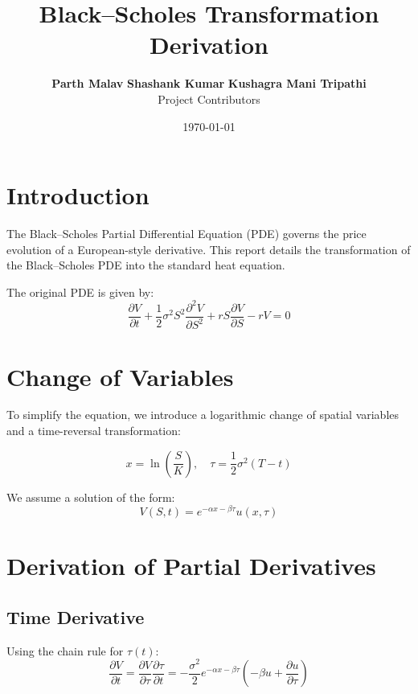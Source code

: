\documentclass[11pt,a4paper]{article}
\title{\vspace{-2cm} \textbf{Black--Scholes Transformation Derivation}}
\author{
    \textbf{Parth Malav} \quad 
    \textbf{Shashank Kumar} \quad 
    \textbf{Kushagra Mani Tripathi} \\
    \small Project Contributors
}
\date{\today}
\begin{document}
\maketitle

\section{Introduction}
The Black--Scholes Partial Differential Equation (PDE) governs the price evolution of a European-style derivative. This report details the transformation of the Black--Scholes PDE into the standard heat equation.

The original PDE is given by:
\begin{equation}
\frac{\partial V}{\partial t}
+ \frac{1}{2}\sigma^2 S^2 \frac{\partial^2 V}{\partial S^2}
+ rS \frac{\partial V}{\partial S}
- rV = 0
\end{equation}

\section{Change of Variables}
To simplify the equation, we introduce a logarithmic change of spatial variables and a time-reversal transformation:

\begin{mdframed}[linecolor=gray!20, backgroundcolor=gray!5]
\begin{equation}
x = \ln\left(\frac{S}{K}\right), \quad \tau = \frac{1}{2}\sigma^2 (T - t)
\end{equation}
\end{mdframed}

We assume a solution of the form:
\begin{equation}
V(S,t) = e^{-\alpha x - \beta \tau} u(x,\tau)
\end{equation}

\section{Derivation of Partial Derivatives}

\subsection{Time Derivative}
Using the chain rule for $\tau(t)$:
\begin{equation}
\frac{\partial V}{\partial t} = \frac{\partial V}{\partial \tau} \frac{\partial \tau}{\partial t} = -\frac{\sigma^2}{2} e^{-\alpha x - \beta \tau} \left( -\beta u + \frac{\partial u}{\partial \tau} \right)
\end{equation}
\end{document}
